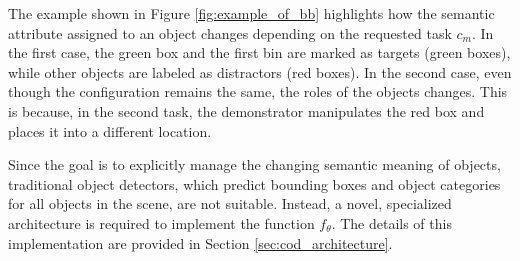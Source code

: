 The example shown in Figure \ref{fig:example_of_bb} highlights how the semantic attribute assigned to an object changes depending on the requested task $c_{m}$. In the first case, the green box and the first bin are marked as targets (green boxes), while other objects are labeled as distractors (red boxes). In the second case, even though the configuration remains the same, the roles of the objects changes. This is because, in the second task, the demonstrator manipulates the red box and places it into a different location. 

Since the goal is to explicitly manage the changing semantic meaning of objects, traditional object detectors, which predict bounding boxes and object categories for all objects in the scene, are not suitable. Instead, a novel, specialized architecture is required to implement the function $f_{\theta}$. The details of this implementation are provided in Section \ref{sec:cod_architecture}.



